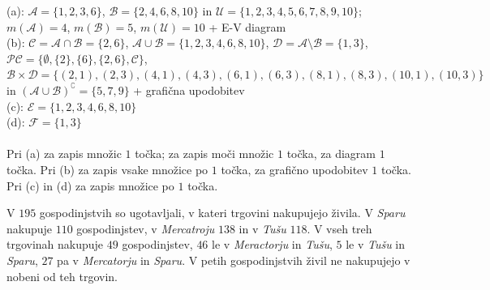 \documentclass[addpoints,12pt]{exam}
\begin{document}
\begin{questions}
    \begin{solution}[12cm]
        (a): $\mathcal{A}=\{1,2,3,6\}$, $\mathcal{B}=\{2,4,6,8,10\}$ in $\mathcal{U}=\{1,2,3,4,5,6,7,8,9,10\}$; $m(\mathcal{A})=4$, $m(\mathcal{B})=5$, $m(\mathcal{U})=10$ + E-V diagram \\
        (b): $\mathcal{C}=\mathcal{A}\cap\mathcal{B}=\{2,6\}$, $\mathcal{A}\cup\mathcal{B}=\{1,2,3,4,6,8,10\}$, $\mathcal{D}=\mathcal{A}\setminus\mathcal{B}=\{1,3\}$, $\mathcal{PC}=\{\emptyset,\{2\},\{6\},\{2,6\},\mathcal{C}\}$, $\mathcal{B}\times\mathcal{D}=\{(2,1),(2,3),(4,1),(4,3),(6,1),(6,3),(8,1),(8,3),(10,1),(10,3)\}$ in $(\mathcal{A}\cup\mathcal{B})^\complement=\{5,7,9\}$ + grafična upodobitev\\
        (c): $\mathcal{E}=\{1,2,3,4,6,8,10\}$ \\
        (d): $\mathcal{F}=\{1,3\}$ \\ \\
        Pri (a) za zapis množic $1$ točka; za zapis moči množic $1$ točka, za diagram $1$ točka. Pri (b) za zapis vsake množice po $1$ točka, za grafično upodobitev $1$ točka. Pri (c) in (d) za zapis množice po $1$ točka.
    \end{solution}






      \newpage
    \question
    V $195$ gospodinjstvih so ugotavljali, v kateri trgovini nakupujejo živila. V \textit{Sparu} nakupuje $110$ gospodinjstev, v \textit{Mercatroju} $138$ in v \textit{Tušu} $118$.
    V vseh treh trgovinah nakupuje $49$ gospodinjstev, $46$ le v \textit{Meractorju} in \textit{Tušu}, $5$ le v \textit{Tušu} in \textit{Sparu}, $27$ pa v \textit{Mercatorju} in \textit{Sparu}. 
    V petih gospodinjstvih živil ne nakupujejo v nobeni od teh trgovin.


\end{questions}
\end{document}
